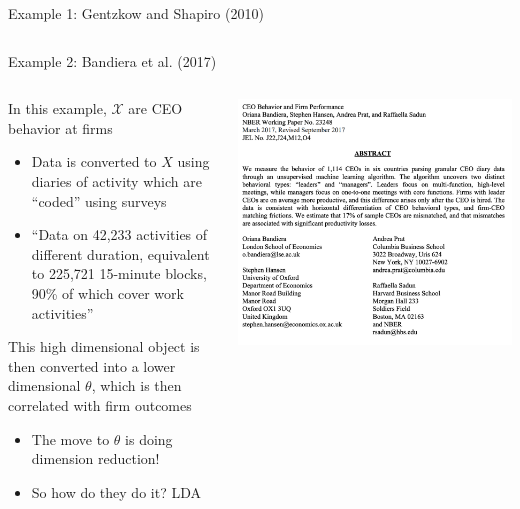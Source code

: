 \documentclass[notes,11pt, aspectratio=169]{beamer}
\newenvironment{wideitemize}{\itemize\addtolength{\itemsep}{10pt}}{\enditemize}
\begin{document}
\begin{frame}{Example 1: Gentzkow and Shapiro (2010)}
\begin{columns}[onlytextwidth, T]
\begin{column}{.5\textwidth}
    \end{column}%
  \end{columns}
\end{frame}

\begin{frame}{Example 2: Bandiera et al. (2017)}
    \begin{columns}[onlytextwidth, T] %
      \begin{column}{.5\textwidth}
        \begin{wideitemize}
        \item In this example, $\mathcal{X}$ are CEO behavior at firms
          \begin{itemize}
          \item Data is converted to $X$ using diaries of activity
            which are ``coded'' using surveys
          \item ``Data on 42,233 activities of different duration,
            equivalent to 225,721 15-minute blocks, 90\% of which
            cover work activities''
          \end{itemize}
        \item This high dimensional object is then converted into a lower dimensional $\theta$, which is then correlated with firm outcomes
          \begin{itemize}
          \item The move to $\theta$ is doing dimension reduction!
          \item So how do they do it? LDA
          \end{itemize}
        \end{wideitemize}
      \end{column}%
      \hfill%
      \begin{column}{.5\textwidth}
        \includegraphics[width=\linewidth]{images/bandiera_1.png}
      \end{column}%
    \end{columns}
  \end{frame}
\end{document}
